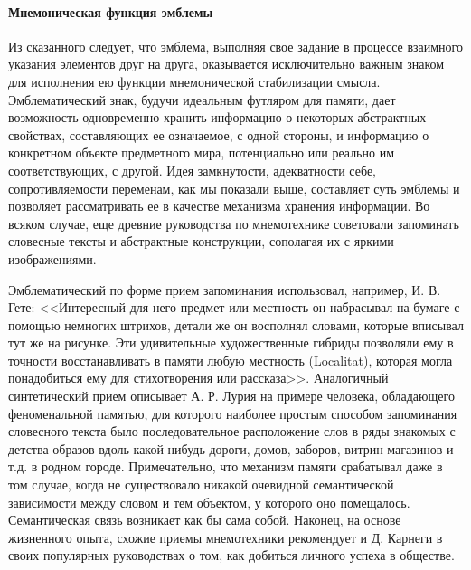 \paragraph{Мнемоническая функция эмблемы}

Из сказанного следует, что эмблема, выполняя свое задание в процессе взаимного указания элементов
друг на друга, оказывается исключительно важным знаком для исполнения ею функции мнемонической
стабилизации смысла. Эмблематический знак, будучи идеальным футляром для памяти, дает возможность
одновременно хранить информацию о некоторых абстрактных свойствах, составляющих ее означаемое, с
одной стороны, и информацию о конкретном объекте предметного мира, потенциально или реально им
соответствующих, с другой. Идея замкнутости, адекватности себе, сопротивляемости переменам, как мы
показали выше, составляет суть эмблемы и позволяет рассматривать ее в качестве механизма хранения
информации. Во всяком случае, еще древние руководства по мнемотехнике советовали запоминать
словесные тексты и абстрактные конструкции, сополагая их с яркими изображениями.\autocite[][49]{grigoreva2005}

Эмблематический по форме прием запоминания использовал, например, И. В. Гете: <<Интересный для него
предмет или местность он набрасывал на бумаге с помощью немногих штрихов, детали же он восполнял
словами, которые вписывал тут же на рисунке. Эти удивительные художественные гибриды позволяли ему в
точности восстанавливать в памяти любую местность (Localitat), которая могла понадобиться ему для
стихотворения или рассказа>>. \autocite{bahtin1979}\autocite[][219]{bahtin1979full} Аналогичный
синтетический прием описывает А. Р. Лурия на примере человека, обладающего феноменальной памятью,
для которого наиболее простым способом запоминания словесного текста было последовательное
расположение слов в ряды знакомых с детства образов вдоль какой-нибудь дороги, домов, заборов,
витрин магазинов и т.д. в родном городе. \autocite[]{luria1979}
Примечательно, что механизм памяти срабатывал даже в том случае, когда не
существовало никакой очевидной семантической зависимости между словом и тем объектом, у которого оно
помещалось. Семантическая связь возникает как бы сама собой. Наконец, на основе жизненного опыта,
схожие приемы мнемотехники рекомендует и Д. Карнеги в своих популярных руководствах о том, как
добиться личного успеха в обществе. \autocite[][237--420]{karnegi1996}


